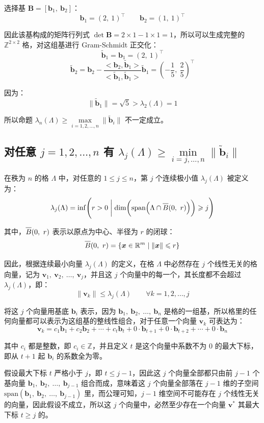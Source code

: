 \documentclass{article}
\newcommand{\barline}[1]{\overline{#1\rule{0pt}{1.75ex}}}
\begin{document}
选择基 $\bm{B}=[\bm{b}_1,\ \bm{b}_2]$：
\[ \bm{b}_1=(2,\ 1)^{\top}\qquad\bm{b}_2=(1,\ 1)^{\top} \]

因此该基构成的矩阵行列式 $\det\bm{B}=2\times1-1\times1=1$，所以可以生成完整的 $\mathbb{Z}^{2\times2}$ 格，对这组基进行 Gram-Schmidt 正交化：
\[ \tilde{\bm{b}}_1=\bm{b}_1=(2,\ 1)^{\top} \]
\[ \tilde{\bm{b}}_2=\bm{b}_2-\dfrac{<\bm{b}_2,\tilde{\bm{b}}_1>}{<\tilde{\bm{b}}_1,\tilde{\bm{b}}_1>}\tilde{\bm{b}}_1=\left(-\dfrac{1}{5},\ \dfrac{2}{5}\right)^{\top} \]

因为：
\[ \|\tilde{\bm{b}}_1\|=\sqrt{5}>\lambda_2(\Lambda)=1 \]

所以命题 $\lambda_n(\Lambda)\geqslant\max\limits_{i=1,2,\ldots,n}\|\tilde{\bm{b}}_i\|$ 不一定成立。



\subsection{对任意 $j=1,2,\ldots,n$ 有 $\lambda_j(\Lambda)\geqslant\min\limits_{i=j,\ldots,n}\|\tilde{\bm{b}}_i\|$}
在秩为 $n$ 的格 $\Lambda$ 中，对任意的 $1\leqslant j\leqslant n$，第 $j$ 个连续极小值 $\lambda_j(\Lambda)$ 被定义为：
\[ \lambda_j(\Lambda)=\inf\Biggl(r>0\biggm|\dim\biggl(\text{span}\Bigl(\Lambda\cap\barline{B}(0,\ r)\Bigr)\biggr)\geqslant j\Biggr) \]

其中，$\barline{B}(0,\ r)$ 表示以原点为中心、半径为 $r$ 的闭球：
\[ \barline{B}(0,\ r)=\{\bm{x}\in\mathbb{R}^{m}\mid\|\bm{x}\|\leqslant r\} \]

因此，根据连续最小向量 $\lambda_j(\Lambda)$ 的定义，在格 $\Lambda$ 中必然存在 $j$ 个线性无关的格向量，记为 $\bm{v}_1,\ \bm{v}_2,\ \ldots,\ \bm{v}_j$，并且这 $j$ 个向量中的每一个，其长度都不会超过 $\lambda_j(\Lambda)$，即：
\[ \|\bm{v}_k\|\leqslant\lambda_j(\Lambda)\qquad\forall k=1,2,\ldots,j \]

将这 $j$ 个向量用基底 $\bm{b}_i$ 表示，因为 $\bm{b}_1,\ \bm{b}_2,\ \ldots,\ \bm{b}_n$ 是格的一组基，所以格里的任何向量都可以表示为这组基的整线性组合，对于任意一个向量 $\bm{v}_k$ 可表达为：
\[ \bm{v}_k=c_1\bm{b}_1+c_2\bm{b}_2+\cdots+c_t\bm{b}_t+0\cdot\bm{b}_{t+1}+0\cdot\bm{b}_{t+2}+\cdots+0\cdot\bm{b}_{n} \]

其中 $c_i$ 都是整数，即 $c_i\in\mathbb{Z}$，并且定义 $t$ 是这个向量中系数不为 0 的最大下标，即从 $t+1$ 起 $\bm{b}_i$ 的系数全为零。

假设最大下标 $t$ 严格小于 $j$，即 $t\leqslant j-1$，因此这 $j$ 个向量全部都只由前 $j-1$ 个基向量 $\bm{b}_1,\ \bm{b}_2,\ \ldots,\ \bm{b}_{j-1}$ 组合而成，意味着这 $j$ 个向量全部落在 $j-1$ 维的子空间 $\text{span}(\bm{b}_1,\ \bm{b}_2,\ \ldots,\ \bm{b}_{j-1})$ 里，而公理可知，$j-1$ 维空间不可能存在 $j$ 个线性无关的向量，因此假设不成立，所以这 $j$ 个向量中，必然至少存在一个向量 $\bm{v}^*$ 其最大下标 $t\geqslant j$ 的。
\end{document}
